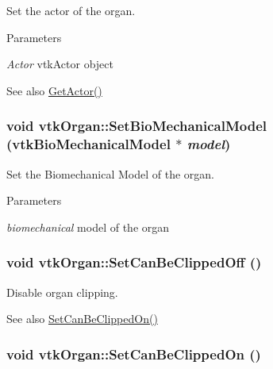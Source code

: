 Set the actor of the organ. 


\begin{DoxyParams}{Parameters}
\item[{\em Actor}]vtkActor object \end{DoxyParams}
\begin{DoxySeeAlso}{See also}
\hyperlink{classvtkOrgan_af12bcf578df2448068251a80b08822c1}{GetActor()} 
\end{DoxySeeAlso}
\hypertarget{classvtkOrgan_ad163fb8b19cb52cf99eb350512945510}{
\subsubsection[{SetBioMechanicalModel}]{\setlength{\rightskip}{0pt plus 5cm}void vtkOrgan::SetBioMechanicalModel (vtkBioMechanicalModel $\ast$ {\em model})}}
\label{classvtkOrgan_ad163fb8b19cb52cf99eb350512945510}


Set the Biomechanical Model of the organ. 


\begin{DoxyParams}{Parameters}
\item[{\em biomechanical}]model of the organ \end{DoxyParams}
\hypertarget{classvtkOrgan_a6faee69d6495879b5f545bf1446dd304}{
\subsubsection[{SetCanBeClippedOff}]{\setlength{\rightskip}{0pt plus 5cm}void vtkOrgan::SetCanBeClippedOff ()}}
\label{classvtkOrgan_a6faee69d6495879b5f545bf1446dd304}


Disable organ clipping. 

\begin{DoxySeeAlso}{See also}
\hyperlink{classvtkOrgan_a65da602da9636309dcfa094b537a9fef}{SetCanBeClippedOn()} 
\end{DoxySeeAlso}
\hypertarget{classvtkOrgan_a65da602da9636309dcfa094b537a9fef}{
\subsubsection[{SetCanBeClippedOn}]{\setlength{\rightskip}{0pt plus 5cm}void vtkOrgan::SetCanBeClippedOn ()}}
\label{classvtkOrgan_a65da602da9636309dcfa094b537a9fef}


